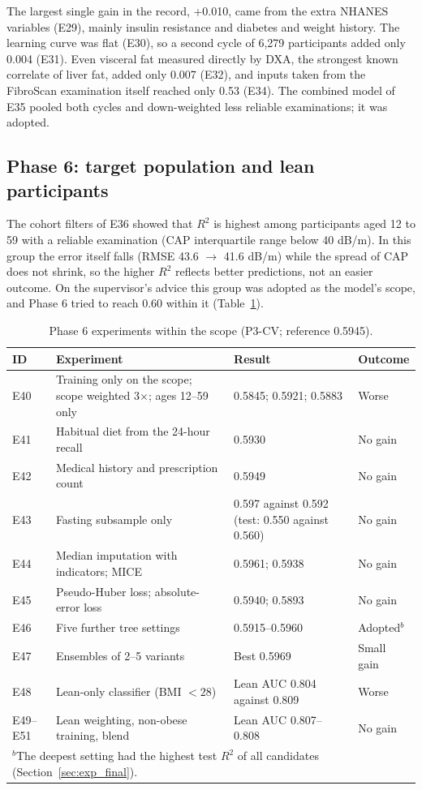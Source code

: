 The largest single gain in the record, +0.010, came from the extra NHANES
variables (E29), mainly insulin resistance and diabetes and weight history.
The learning curve was flat (E30), so a second cycle of 6,279 participants
added only 0.004 (E31). Even visceral fat measured directly by DXA, the
strongest known correlate of liver fat, added only 0.007 (E32), and inputs
taken from the FibroScan examination itself reached only 0.53 (E34). The
combined model of E35 pooled both cycles and down-weighted less reliable
examinations; it was adopted.

\subsection{Phase 6: target population and lean participants}

The cohort filters of E36 showed that $R^2$ is highest among participants aged
12 to 59 with a reliable examination (CAP interquartile range below
40 dB/m). In this group the error itself falls (RMSE 43.6 $\rightarrow$
41.6 dB/m) while the spread of CAP does not shrink, so the higher $R^2$
reflects better predictions, not an easier outcome. On the supervisor's
advice this group was adopted as the model's scope, and Phase 6 tried to
reach 0.60 within it (Table~\ref{tab:exp_p6}).

\begin{table}[htbp]
\centering
\caption{Phase 6 experiments within the scope (P3-CV; reference 0.5945).}
\label{tab:exp_p6}
\begin{tabular}{p{0.8cm}p{4.2cm}p{5.2cm}p{1.8cm}}
\toprule
ID & Experiment & Result & Outcome \\
\midrule
E40 & Training only on the scope; scope weighted 3$\times$; ages 12--59 only & 0.5845; 0.5921; 0.5883 & Worse \\
E41 & Habitual diet from the 24-hour recall & 0.5930 & No gain \\
E42 & Medical history and prescription count & 0.5949 & No gain \\
E43 & Fasting subsample only & 0.597 against 0.592 (test: 0.550 against 0.560) & No gain \\
E44 & Median imputation with indicators; MICE & 0.5961; 0.5938 & No gain \\
E45 & Pseudo-Huber loss; absolute-error loss & 0.5940; 0.5893 & No gain \\
E46 & Five further tree settings & 0.5915--0.5960 & Adopted$^{b}$ \\
E47 & Ensembles of 2--5 variants & Best 0.5969 & Small gain \\
E48 & Lean-only classifier (BMI $<28$) & Lean AUC 0.804 against 0.809 & Worse \\
E49--E51 & Lean weighting, non-obese training, blend & Lean AUC 0.807--0.808 & No gain \\
\bottomrule
\multicolumn{4}{l}{\small $^{b}$The deepest setting had the highest test $R^2$ of all candidates (Section~\ref{sec:exp_final}).}
\end{tabular}
\end{table}


